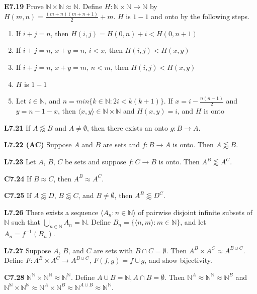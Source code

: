 \documentclass[10pt, landscape]{article}
\begin{document}
\begin{multicols*}{3}
\textbf{E7.19} Prove $\mathbb{N} \times \mathbb{N} \approx \mathbb{N}$. Define $H: \mathbb{N} \times \mathbb{N} \rightarrow \mathbb{N}$ by $H(m, n)=\frac{(m+n)(m+n+1)}{2}+m$. $H$ is $1-1$ and onto by the following steps.
\begin{enumerate}
    \item If $i+j=n$, then $H(i, j)=H(0, n)+i<H(0, n+1)$
    \item If $i+j=n$, $x+y=n$, $i< x$, then $H(i, j) < H(x, y)$
    \item If $i+j=n$, $x+y=m$, $n<m$, then $H(i, j)<H(x, y)$
    \item $H$ is $1-1$
    \item Let $i \in \mathbb{N}$, and $n=min\{k \in \mathbb{N} : 2i < k(k+1)\}$. If $x=i-\frac{n(n-1)}{2}$ and $y=n-1-x$, then $\langle x, y \rangle \in \mathbb{N} \times \mathbb{N}$ and $H(x, y)=i$, and $H$ is onto
\end{enumerate}

\textbf{L7.21} If $A \lessapprox B$ and $A \neq \emptyset$, then there exists an onto $g:B\rightarrow A$.

\textbf{L7.22 (AC)} Suppose $A$ and $B$ are sets and $f: B \rightarrow A$ is onto. Then $A \lessapprox B$.

\textbf{L7.23} Let $A$, $B$, $C$ be sets and suppose $f:C\rightarrow B$ is onto. Then $A^B \lessapprox A^C$.

\textbf{C7.24} If $B \approx C$, then $A^B \approx A^C$.

\textbf{C7.25} If $A \lessapprox D$, $B \lessapprox C$, and $B \neq \emptyset$, then $A^B \lessapprox D^C$.

\textbf{L7.26} There exists a sequence $\langle A_n: n \in \mathbb{N} \rangle$ of pairwise disjoint infinite subsets of $\mathbb{N}$ such that $\bigcup_{n\in \mathbb{N}}A_n=\mathbb{N}$. Define $B_n=\{\langle n, m \rangle:m \in \mathbb{N}\}$, and let $A_n=f^{-1}(B_n)$.

\textbf{L7.27} Suppose $A$, $B$, and $C$ are sets with $B \cap C = \emptyset$. Then $A^B \times A^C \approx A^{B \cup C}$. Define $F:A^B\times A^C \rightarrow A^{B \cup C}$, $F(f, g) = f \cup g$, and show bijectivity.

\textbf{C7.28} $\mathbb{N}^\mathbb{N} \times \mathbb{N}^\mathbb{N} \approx \mathbb{N}^\mathbb{N}$. Define $A \cup B = \mathbb{N}, A \cap B = \emptyset$. Then $\mathbb{N}^A\approx \mathbb{N}^\mathbb{N} \approx \mathbb{N}^B$ and $\mathbb{N}^\mathbb{N}\times\mathbb{N}^\mathbb{N}\approx \mathbb{N}^A\times\mathbb{N}^B\approx \mathbb{N}^{A \cup B}\approx \mathbb{N}^\mathbb{N}$.


\end{multicols*}
\end{document}
